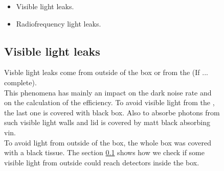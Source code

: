 \begin{figure}[!hbtp]
  \begin{itemize}
   \item Visible light leaks.
   \item Radiofrequency light leaks.   
  \end{itemize}
  
  \subsection{Visible light leaks}
  
  Visble light leaks come from outside of the box or from the \xfl (If ... complete).\\
  This phenomena has mainly an impact on the dark noise rate and on the calculation of the efficiency.
  To avoid visible light from the \xfl, the last one is covered with black box. Also to absorbe photons from such visible light
  walls and lid is covered by matt black absorbing vin.\\
  To avoid light from outside of the box, the whole box was covered with a black tissue. The section \ref{} shows how we check if some
  visible light from outside could reach detectors inside the box. 
  

\end{figure}
